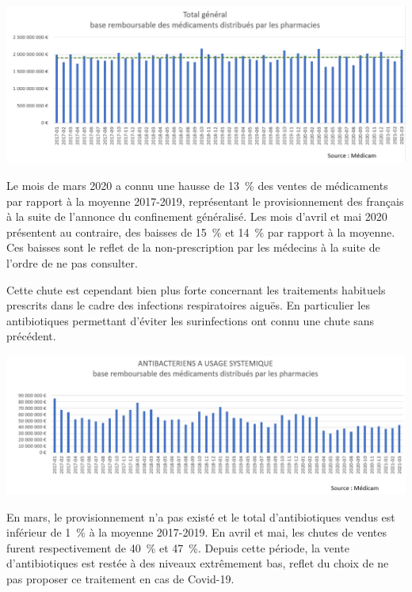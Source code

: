 \documentclass[
]{article}
\begin{document}
\includegraphics[width=10.41667in,height=\textheight]{data/images/medictot.png}

Le mois de mars 2020 a connu une hausse de 13~\% des ventes de
médicaments par rapport à la moyenne 2017-2019, représentant le
provisionnement des français à la suite de l'annonce du confinement
généralisé. Les mois d'avril et mai 2020 présentent au contraire, des
baisses de 15~\% et 14~\% par rapport à la moyenne. Ces baisses sont le
reflet de la non-prescription par les médecins à la suite de l'ordre de
ne pas consulter.

Cette chute est cependant bien plus forte concernant les traitements
habituels prescrits dans le cadre des infections respiratoires aiguës.
En particulier les antibiotiques permettant d'éviter les surinfections
ont connu une chute sans précédent.

\includegraphics[width=10.41667in,height=\textheight]{data/images/medicbac.png}

En mars, le provisionnement n'a pas existé et le total d'antibiotiques
vendus est inférieur de 1~\% à la moyenne 2017-2019. En avril et mai,
les chutes de ventes furent respectivement de 40~\% et 47~\%. Depuis
cette période, la vente d'antibiotiques est restée à des niveaux
extrêmement bas, reflet du choix de ne pas proposer ce traitement en cas
de Covid-19.
\end{document}
